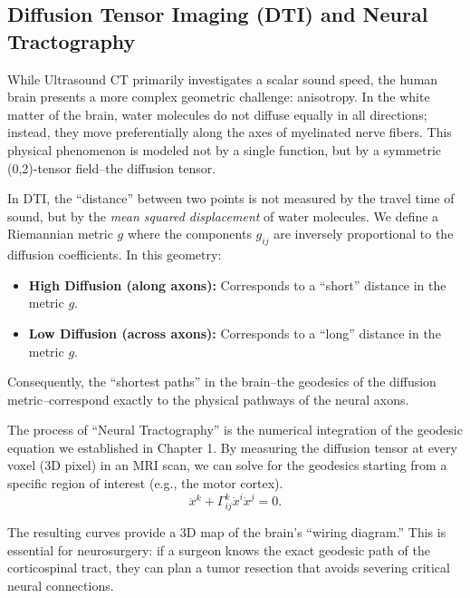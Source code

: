 \subsection{Diffusion Tensor Imaging (DTI) and Neural Tractography}
\label{sub_sec:dti_and_neural_tractography}

While Ultrasound CT primarily investigates a scalar sound speed, the human brain presents a more complex geometric challenge: anisotropy. In the white matter of the brain, water molecules do not diffuse equally in all directions; instead, they move preferentially along the axes of myelinated nerve fibers. This physical phenomenon is modeled not by a single function, but by a symmetric (0,2)-tensor field--the diffusion tensor.

In DTI, the ``distance'' between two points is not measured by the travel time of sound, but by the \emph{mean squared displacement} of water molecules. We define a Riemannian metric $g$ where the components $g_{ij}$ are inversely proportional to the diffusion coefficients. In this geometry:

\begin{itemize}
  \item \textbf{High Diffusion (along axons):} Corresponds to a ``short'' distance in the metric $g$.
  \item \textbf{Low Diffusion (across axons):} Corresponds to a ``long'' distance in the metric $g$.
\end{itemize}

Consequently, the ``shortest paths'' in the brain--the geodesics of the diffusion metric--correspond exactly to the physical pathways of the neural axons.

The process of ``Neural Tractography'' is the numerical integration of the geodesic equation we established in Chapter 1. By measuring the diffusion tensor at every voxel (3D pixel) in an MRI scan, we can solve for the geodesics starting from a specific region of interest (e.g., the motor cortex).
\[%
  \ddot{x}^k + \Gamma^k_{ij} \dot{x}^i \dot{x}^j = 0
.\]%

The resulting curves provide a 3D map of the brain's ``wiring diagram.'' This is essential for neurosurgery: if a surgeon knows the exact geodesic path of the corticospinal tract, they can plan a tumor resection that avoids severing critical neural connections.

